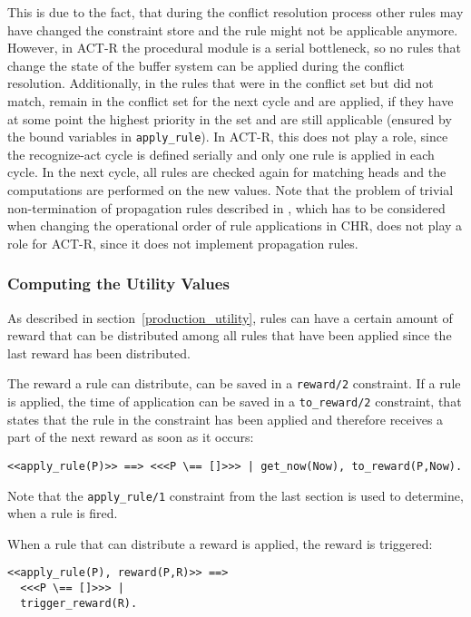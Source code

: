 This is due to the fact, that during the conflict resolution process other rules may have changed the constraint store and the rule might not be applicable anymore. However, in ACT-R the procedural module is a serial bottleneck, so no rules that change the state of the buffer system can be applied during the conflict resolution. Additionally, in \cite{fru_chr_book_2009} the rules that were in the conflict set but did not match, remain in the conflict set for the next cycle and are applied, if they have at some point the highest priority in the set and are still applicable (ensured by the bound variables in \lstinline|apply_rule|). In ACT-R, this does not play a role, since the recognize-act cycle is defined serially and only one rule is applied in each cycle. In the next cycle, all rules are checked again for matching heads and the computations are performed on the new values. Note that the problem of trivial non-termination of propagation rules described in \cite[5]{abdennadher_sts_chr13}, which has to be considered when changing the operational order of rule applications in CHR, does not play a role for ACT-R, since it does not implement propagation rules.

\subsubsection{Computing the Utility Values}

As described in section~\ref{production_utility}, rules can have a certain amount of reward that can be distributed among all rules that have been applied since the last reward has been distributed.

The reward a rule can distribute, can be saved in a \lstinline|reward/2| constraint. If a rule is applied, the time of application can be saved in a \lstinline|to_reward/2| constraint, that states that the rule in the constraint has been applied and therefore receives a part of the next reward as soon as it occurs: 

\begin{lstlisting}
<<apply_rule(P)>> ==> <<<P \== []>>> | get_now(Now), to_reward(P,Now).
\end{lstlisting}

Note that the \lstinline|apply_rule/1| constraint from the last section is used to determine, when a rule is fired.

When a rule that can distribute a reward is applied, the reward is triggered:

\begin{lstlisting}
<<apply_rule(P), reward(P,R)>> ==>
  <<<P \== []>>> |
  trigger_reward(R).
\end{lstlisting}

